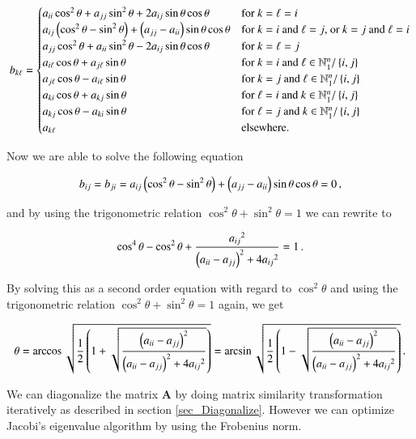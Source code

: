 \documentclass[11pt,english,a4paper]{article}
\begin{document}
\begin{flushleft}
\begin{align}
b_{k\ell} = \begin{cases} a_{ii} \cos^2\theta  + a_{jj}\sin^2 \theta + 2 a_{ij}\sin\theta\cos\theta & \text{for $k=\ell=i$} \\ a_{ij}\left({\cos^2\theta - \sin^2\theta}\right) + \left({a_{jj}-a_{ii}}\right)\sin\theta\cos\theta & \text{for $k=i$ and $\ell = j$, or $k=j$ and $\ell = i$} \\ a_{jj} \cos^2\theta  + a_{ii}\sin^2 \theta - 2 a_{ij}\sin\theta\cos\theta & \text{for $k=\ell=j$} \\ a_{i \ell} \cos\theta +  a_{j\ell} \sin\theta & \text{for $k=i$ and $\ell\in\mathbb{N}_1^n / \left\lbrace{i,j}\right\rbrace$} \\ a_{j\ell} \cos\theta - a_{i\ell}\sin\theta & \text{for $k=j$ and $\ell\in\mathbb{N}_1^n / \left\lbrace{i,j}\right\rbrace$} \\ a_{ki} \cos\theta + a_{kj}\sin\theta & \text{for $\ell=i$ and $k\in\mathbb{N}_1^n / \left\lbrace{i,j}\right\rbrace$} \\ a_{kj}\cos\theta - a_{ki}\sin\theta & \text{for $\ell=j$ and $k\in\mathbb{N}_1^n / \left\lbrace{i,j}\right\rbrace$} \\ a_{k\ell} & \text{elsewhere.}\end{cases}
\label{eq_7}
\end{align}

Now we are able to solve the following equation

\begin{align*}
b_{ij}=b_{ji} = a_{ij}\left({\cos^2\theta - \sin^2\theta}\right)+\left({a_{jj}-a_{ii}}\right)\sin\theta\cos\theta = 0 \,,
\end{align*}

and by using the trigonometric relation $\cos^2\theta+\sin^2\theta = 1$ we can rewrite to

\begin{align*}
\cos^4\theta -\cos^2\theta + \frac{{a_{ij}}^2}{\left({a_{ii}-a_{jj}}\right)^2 + 4 {a_{ij}}^2} = 1\,.
\end{align*}

By solving this as a second order equation with regard to $\cos^2\theta$ and using the trigonometric relation $\cos^2\theta+\sin^2\theta = 1$ again, we get

\begin{align}
\theta = \arccos\sqrt{\frac{1}{2}\left({1+\sqrt{\frac{\left({a_{ii}-a_{jj}}\right)^2}{\left({a_{ii}-a_{jj}}\right)^2+4{a_{ij}}^2}}}\right)} = \arcsin\sqrt{\frac{1}{2}\left({1-\sqrt{\frac{\left({a_{ii}-a_{jj}}\right)^2}{\left({a_{ii}-a_{jj}}\right)^2+4{a_{ij}}^2}}}\right)} \,.
\end{align}

We can diagonalize the matrix $\mathbf{A}$ by doing matrix similarity transformation iteratively as described in section \ref{sec_Diagonalize}. However we can optimize Jacobi's eigenvalue algorithm by using  the Frobenius norm.


\end{flushleft}
\end{document}
